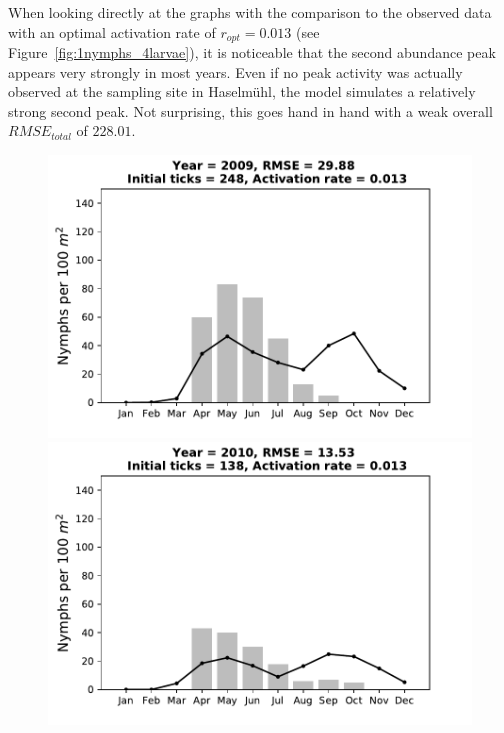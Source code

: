 \documentclass[a4paper, 11pt]{scrartcl}
\begin{document}
When looking directly at the graphs with the comparison to the observed data with an optimal activation rate of $r_{opt}= 0.013$ (see Figure~\ref{fig:1nymphs_4larvae}), it is noticeable that the second abundance peak appears very strongly in most years. Even if no peak activity was actually observed at the sampling site in Haselmühl, the model simulates a relatively strong second peak. Not surprising, this goes hand in hand with a weak overall $RMSE_{total}$ of $228.01$.

\begin{figure}[h!]
\centering
\begin{minipage}[c]{0.40\linewidth}
\includegraphics[width=\linewidth]{figures/s5/S5_2009}
\end{minipage}
\begin{minipage}[c]{0.40\linewidth}
\includegraphics[width=\linewidth]{figures/s5/S5_2010}
\end{minipage}

\end{figure}
\end{document}
